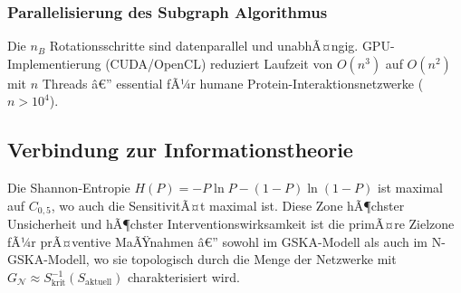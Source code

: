 ﻿\documentclass[12pt, a4paper]{article}
\theoremstyle{definition}
\theoremstyle{remark}
\newcommand{\calN}{\mathcal{N}}
\newcommand{\GN}{G_{\calN}}
\begin{document}
\subsubsection{Parallelisierung des Subgraph Algorithmus}

Die $n_B$ Rotationsschritte sind datenparallel und unabhÃ¤ngig. GPU-Implementierung
(CUDA/OpenCL) reduziert Laufzeit von $O(n^3)$ auf $O(n^2)$ mit $n$ Threads â€”
essential fÃ¼r humane Protein-Interaktionsnetzwerke ($n > 10^4$).

\subsection{Verbindung zur Informationstheorie}

Die Shannon-Entropie $H(P) = -P\ln P - (1-P)\ln(1-P)$ ist maximal auf $C_{0{,}5}$,
wo auch die SensitivitÃ¤t maximal ist. Diese Zone hÃ¶chster Unsicherheit und hÃ¶chster
Interventionswirksamkeit ist die primÃ¤re Zielzone fÃ¼r prÃ¤ventive MaÃŸnahmen â€”
sowohl im GSKA-Modell als auch im N-GSKA-Modell, wo sie topologisch durch die
Menge der Netzwerke mit $\GN \approx S^{-1}_{\mathrm{krit}}(S_{\mathrm{aktuell}})$
charakterisiert wird.
\end{document}
